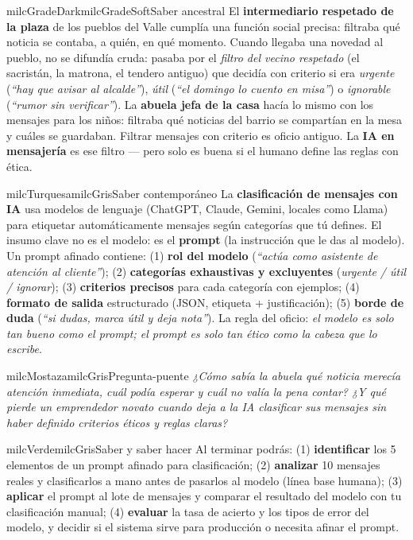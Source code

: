 \documentclass[11pt,letterpaper]{article}
\begin{document}
\begin{softbox}{milcGradeDark}{milcGradeSoft}{Saber ancestral}
El \textbf{intermediario respetado de la plaza} de los pueblos del Valle cumplía una función social precisa: filtraba qué noticia se contaba, a quién, en qué momento. Cuando llegaba una novedad al pueblo, no se difundía cruda: pasaba por el \emph{filtro del vecino respetado} (el sacristán, la matrona, el tendero antiguo) que decidía con criterio si era \emph{urgente} (\emph{``hay que avisar al alcalde''}), \emph{útil} (\emph{``el domingo lo cuento en misa''}) o \emph{ignorable} (\emph{``rumor sin verificar''}). La \textbf{abuela jefa de la casa} hacía lo mismo con los mensajes para los niños: filtraba qué noticias del barrio se compartían en la mesa y cuáles se guardaban. Filtrar mensajes con criterio es oficio antiguo. La \textbf{IA en mensajería} es ese filtro --- pero solo es buena si el humano define las reglas con ética.
\end{softbox}

\begin{softbox}{milcTurquesa}{milcGris}{Saber contemporáneo}
La \textbf{clasificación de mensajes con IA} usa modelos de lenguaje (ChatGPT, Claude, Gemini, locales como Llama) para etiquetar automáticamente mensajes según categorías que tú defines. El insumo clave no es el modelo: es el \textbf{prompt} (la instrucción que le das al modelo). Un prompt afinado contiene: (1) \textbf{rol del modelo} (\emph{``actúa como asistente de atención al cliente''}); (2) \textbf{categorías exhaustivas y excluyentes} (\emph{urgente / útil / ignorar}); (3) \textbf{criterios precisos} para cada categoría con ejemplos; (4) \textbf{formato de salida} estructurado (JSON, etiqueta + justificación); (5) \textbf{borde de duda} (\emph{``si dudas, marca útil y deja nota''}). La regla del oficio: \emph{el modelo es solo tan bueno como el prompt; el prompt es solo tan ético como la cabeza que lo escribe}.
\end{softbox}

\begin{softbox}{milcMostaza}{milcGris}{Pregunta-puente}
\textit{¿Cómo sabía la abuela qué noticia merecía atención inmediata, cuál podía esperar y cuál no valía la pena contar? ¿Y qué pierde un emprendedor novato cuando deja a la IA clasificar sus mensajes sin haber definido criterios éticos y reglas claras?}
\end{softbox}

\begin{softbox}{milcVerde}{milcGris}{Saber y saber hacer}
Al terminar podrás: (1) \textbf{identificar} los 5 elementos de un prompt afinado para clasificación; (2) \textbf{analizar} 10 mensajes reales y clasificarlos a mano antes de pasarlos al modelo (línea base humana); (3) \textbf{aplicar} el prompt al lote de mensajes y comparar el resultado del modelo con tu clasificación manual; (4) \textbf{evaluar} la tasa de acierto y los tipos de error del modelo, y decidir si el sistema sirve para producción o necesita afinar el prompt.
\end{softbox}
\end{document}
